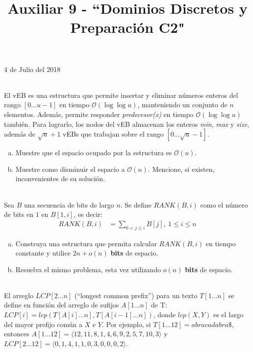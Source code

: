 \documentclass[dcc,uchile]{fcfmcourse}
\title{Auxiliar 9 - ``Dominios Discretos y Preparación C2"}
\theoremstyle{plain}
\theoremstyle{definition}
\begin{document}
\maketitle
\begin{center}
4 de Julio del 2018
\end{center}


\vspace{-1ex}


\begin{problems}
\\
El vEB es una estructura que permite insertar y eliminar números enteros del rango $[0\ldots u-1]$ en tiempo $\mathcal{O}(\log{\log{u}})$, manteniendo un conjunto de $n$ elementos. Además, permite responder \textit{predecesor(x)} en tiempo $\mathcal{O}(\log{\log{u}})$ también. Para lograrlo, los nodos del vEB almacenan los enteros \textit{min}, \textit{max} y \textit{size}, además de $\sqrt{u}+1$ vEBs que trabajan sobre el rango $[0\ldots \sqrt{u}-1]$.
\begin{enumerate}[a)]
    \item Muestre que el espacio ocupado por la estructura es $\mathcal{O}(u)$.
    \item Muestre como disminuir el espacio a $\mathcal{O}(n)$. Mencione, si existen, inconvenientes de su solución.
\end{enumerate}
\\
Sea $B$ una secuencia de bits de largo $n$. Se define $RANK(B, i)$ como el número de bits en $1$ en $B[1,i]$, es decir:
\begin{align*}
    RANK(B, i) &= \sum_{0<j\le i} B[j],\ 1\le i \le n
\end{align*}
\begin{enumerate}[a)]
    \item Construya una estructura que permita calcular $RANK(B,i)$ en tiempo constante y utilice $2n + o(n)$ \textbf{bits} de espacio.
    \item Resuelva el mismo problema, esta vez utilizando $o(n)$ \textbf{bits} de espacio.
\end{enumerate}

\\
El arreglo $LCP[2\ldots n]$ (``longest common prefix'') para un texto $T[1\ldots n]$ se define en función del arreglo de sufijos $A[1\ldots n]$ de T: $LCP[i] = lcp(T[A[i]\ldots n], T[A[i-1]\ldots n])$, donde $lcp(X, Y)$ es el largo del mayor prefijo común a $X$ e $Y$. Por ejemplo, si $T[1\ldots 12] = abracadabra\$$, entonces $A[1\ldots 12] = \langle 12, 11, 8, 1, 4, 6, 9, 2, 5, 7, 10, 3 \rangle$ y $LCP[2\ldots 12] = \langle 0, 1, 4, 1, 1, 0, 3, 0, 0, 0, 2\rangle$.\\


\end{problems}
\end{document}
